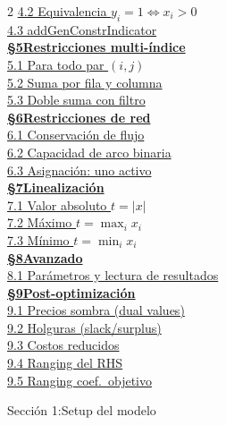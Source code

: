 \documentclass[10pt,a4paper]{article}
\newcommand{\secheader}[2]{%
  \vspace{10pt}%
  \needspace{6cm}%
  \phantomsection\hypertarget{sec#1}{}%
  \noindent%
  \begin{tcolorbox}[
    colback=sectionbg, colupper=white,
    colframe=sectionbg, sharp corners,
    left=8pt, right=8pt, top=5pt, bottom=5pt,
    fontupper=\large\bfseries\sffamily,
  ]
  Secci\'on #1:\enspace #2
  \end{tcolorbox}%
  \vspace{2pt}%
}
\begin{document}
\begin{tcolorbox}[
    colback=sectionbg!8, colframe=sectionbg!35,
    sharp corners, boxrule=0.4pt,
    left=8pt, right=8pt, top=5pt, bottom=5pt,
]
\begin{multicols}{2}
\quad\hyperlink{e42}{4.2 Equivalencia $y_i=1 \Leftrightarrow x_i>0$}\\
\quad\hyperlink{e43}{4.3 addGenConstrIndicator}\\[3pt]
\hyperlink{sec5}{\textbf{\S5\enspace Restricciones multi-\'indice}}\\
\quad\hyperlink{e51}{5.1 Para todo par $(i,j)$}\\
\quad\hyperlink{e52}{5.2 Suma por fila y columna}\\
\quad\hyperlink{e53}{5.3 Doble suma con filtro}\\[3pt]
\hyperlink{sec6}{\textbf{\S6\enspace Restricciones de red}}\\
\quad\hyperlink{e61}{6.1 Conservaci\'on de flujo}\\
\quad\hyperlink{e62}{6.2 Capacidad de arco binaria}\\
\quad\hyperlink{e63}{6.3 Asignaci\'on: uno activo}\\[3pt]
\hyperlink{sec7}{\textbf{\S7\enspace Linealizaci\'on}}\\
\quad\hyperlink{e71}{7.1 Valor absoluto $t=|x|$}\\
\quad\hyperlink{e72}{7.2 M\'aximo $t=\max_i x_i$}\\
\quad\hyperlink{e73}{7.3 M\'inimo $t=\min_i x_i$}\\[3pt]
\hyperlink{sec8}{\textbf{\S8\enspace Avanzado}}\\
\quad\hyperlink{e81}{8.1 Par\'ametros y lectura de resultados}\\[3pt]
\hyperlink{sec9}{\textbf{\S9\enspace Post-optimizaci\'on}}\\
\quad\hyperlink{e91}{9.1 Precios sombra (dual values)}\\
\quad\hyperlink{e92}{9.2 Holguras (slack/surplus)}\\
\quad\hyperlink{e93}{9.3 Costos reducidos}\\
\quad\hyperlink{e94}{9.4 Ranging del RHS}\\
\quad\hyperlink{e95}{9.5 Ranging coef.\ objetivo}
\end{multicols}
\end{tcolorbox}

\vspace{4pt}

\secheader{1}{Setup del modelo}
\end{document}
